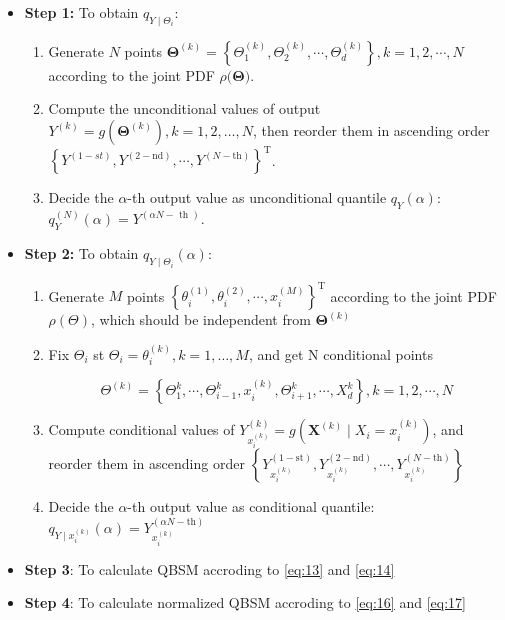\begin{itemize}
\item \textbf{Step 1:} To obtain  $q_{Y \mid \Theta_{i}}$:

\begin{enumerate}[label=(\arabic*),ref=\arabic*]
  \item Generate $N$ points  $\boldsymbol{\Theta}^{(k)}=\left\{\Theta_{1}^{(k)}, \Theta_{2}^{(k)}, \cdots, \Theta_{d}^{(k)}\right\}, k=1,2, \cdots, N$ according to the joint PDF $ \rho (\boldsymbol{\Theta)}$.


  \item Compute the unconditional values of output $Y^{(k)}=g\left(\boldsymbol{\Theta}^{(k)}\right), k=1, 2, \dots, N$, then reorder them in ascending order $\left\{Y^{(1-s t)}, Y^{(2-\mathrm{nd})}, \cdots, Y^{(N-\mathrm{th})}\right\}^{\mathrm{T}}$.

  \item \label{itm:2} Decide the $\alpha$-th output value as unconditional quantile $q_Y(\alpha)$: $q_{Y}^{(N)}(\alpha)=Y^{(\alpha N-\text { th })}$.


\end{enumerate}



\item \textbf{Step 2:} To obtain  $q_{Y \mid \Theta_{i}}(\alpha)$:


\begin{enumerate}[label=(\arabic*),ref=\arabic*]
  \item Generate $M$ points  $\left\{\theta_{i}^{(1)}, \theta_{i}^{(2)}, \cdots, x_{i}^{(M)}\right\}^{\mathrm{T}}$ according to the joint PDF $\rho (\Theta)$, which should be independent from $\boldsymbol{\Theta}^{(k)}$

  \item Fix $\Theta_i$ st $\Theta_i = \theta_i^{(k)}, k= 1, \dots, M$, and get N conditional points


  $$
    \Theta^{(k)}=\left\{\Theta_{1}^{k}, \cdots, \Theta_{i-1}^{k}, x_{i}^{(k)}, \Theta_{i+1}^{k}, \cdots, X_{d}^{k}\right\}, k=1,2, \cdots, N
  $$



  \item Compute conditional values of $Y_{x_{i}^{(k)}}^{(k)}=g\left(\boldsymbol{X}^{(k)} \mid X_{i}=x_{i}^{(k)}\right)$, and reorder them in ascending order $\left\{Y_{x_{i}^{(k)}}^{(1-\mathrm{st})}, Y_{x_{i}^{(k)}}^{(2-\mathrm{nd})}, \cdots, Y_{x_{i}^{(k)}}^{(N-\mathrm{th})}\right\}$


  \item \label{itm:2}  Decide the $\alpha$-th output value as conditional quantile: $q_{Y \mid x_{i}^{(k)}}(\alpha)=Y_{x_{i}^{(k)}}^{(\alpha N-\mathrm{th})}$


\end{enumerate}

\item \textbf{Step 3}: To calculate QBSM accroding to \eqref{eq:13} and \eqref{eq:14}

\item \textbf{Step 4}: To calculate normalized QBSM accroding to \eqref{eq:16} and \eqref{eq:17}

\end{itemize}

